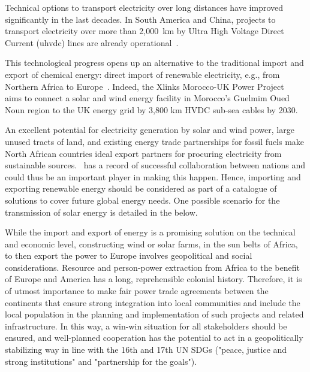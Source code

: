 \documentclass[../SustainableHEP.tex]{subfiles}
\begin{document}
Technical options to transport electricity over long distances have improved significantly in the last decades. In South America and China, projects to transport electricity over more than 2,000~km by Ultra High Voltage Direct Current (\acrshort{uhvdc}) lines are already operational~\cite{Champion}.

This technological progress opens up an alternative to the traditional import and export of chemical energy: direct import of renewable electricity, e.g., from Northern Africa to Europe~\cite{Dueren,Dueren+2011+263+275}. Indeed, the Xlinks Morocco-UK Power Project~\cite{Xlinks} aims to connect a solar and wind energy facility in Morocco's Guelmim Oued Noun region to the UK energy grid by 3,800 km HVDC sub-sea cables by 2030.

An excellent potential for electricity generation by solar and wind power, large unused tracts of land, and existing energy trade partnerships for fossil fuels make North African countries ideal export partners for procuring electricity from sustainable sources.  \ACR\ has a record of successful collaboration between nations and could thus be an important player in making this happen.  Hence, importing and exporting renewable energy should be considered as part of a catalogue of solutions to cover future global energy needs.  One possible scenario for the transmission of solar energy is detailed in the  below. 

While the import and export of energy is a promising solution on the technical and economic level, constructing wind or solar farms, \eg in the sun belts of Africa, to then export the power to Europe involves geopolitical and social considerations. Resource and person-power extraction from Africa to the benefit of Europe and America has a long, reprehensible colonial history. Therefore, it is of utmost importance to make fair power trade agreements between the continents that ensure strong integration into local communities and include the local population in the planning and implementation of such projects and related infrastructure. In this way, a win-win situation for all stakeholders should be ensured, and well-planned cooperation has the potential to act in a geopolitically stabilizing way in line with the 16th and 17th UN SDGs ("peace, justice and strong institutions" and "partnership for the goals"). 
\end{document}
